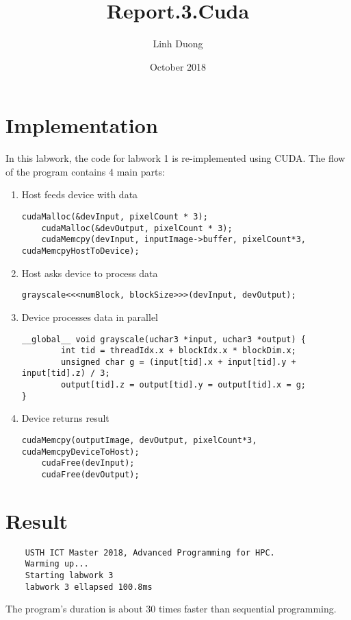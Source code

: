 \documentclass{article}
\title{Report.3.Cuda}
\author{Linh Duong}
\date{October 2018}
\begin{document}
\maketitle

\section{Implementation}
In this labwork, the code for labwork 1 is re-implemented using CUDA. The flow of the program contains 4 main parts:

\begin{enumerate}
    \item Host feeds device with data
    \begin{verbatim}
cudaMalloc(&devInput, pixelCount * 3);
	cudaMalloc(&devOutput, pixelCount * 3);
	cudaMemcpy(devInput, inputImage->buffer, pixelCount*3, cudaMemcpyHostToDevice);
    \end{verbatim}
    \item Host asks device to process data
    \begin{verbatim}
grayscale<<<numBlock, blockSize>>>(devInput, devOutput);
    \end{verbatim}
    \item Device processes data in parallel
    \begin{verbatim}
__global__ void grayscale(uchar3 *input, uchar3 *output) {
    	int tid = threadIdx.x + blockIdx.x * blockDim.x;
    	unsigned char g = (input[tid].x + input[tid].y + input[tid].z) / 3;
    	output[tid].z = output[tid].y = output[tid].x = g;
}
    \end{verbatim}
    \item Device returns result
    \begin{verbatim}
cudaMemcpy(outputImage, devOutput, pixelCount*3, cudaMemcpyDeviceToHost);
	cudaFree(devInput);
	cudaFree(devOutput);
    \end{verbatim}
\end{enumerate}

\section{Result}
\begin{verbatim}
    USTH ICT Master 2018, Advanced Programming for HPC.
    Warming up...
    Starting labwork 3
    labwork 3 ellapsed 100.8ms
\end{verbatim}
The program's duration is about 30 times faster than sequential programming.
\end{document}

